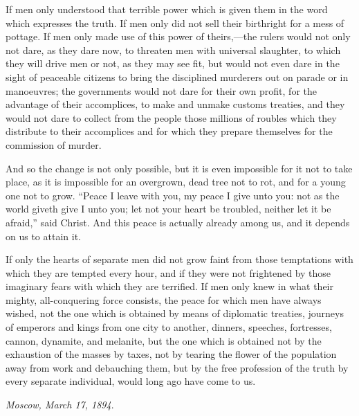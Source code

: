 \documentclass{book}
\begin{document}
If men only understood that terrible power which is given them in the word which expresses the truth. If men only did not sell their birthright for a mess of pottage. If men only made use of this power of theirs,—the rulers would not only not dare, as they dare now, to threaten men with universal slaughter, to which they will drive men or not, as they may see fit, but would not even dare in the sight of peaceable citizens to bring the disciplined murderers out on parade or in manoeuvres; the governments would not dare for their own profit, for the advantage of their accomplices, to make and unmake customs treaties, and they would not dare to collect from the people those millions of roubles which they distribute to their accomplices and for which they prepare themselves for the commission of murder.

And so the change is not only possible, but it is even impossible for it not to take place, as it is impossible for an overgrown, dead tree not to rot, and for a young one not to grow. “Peace I leave with you, my peace I give unto you: not as the world giveth give I unto you; let not your heart be troubled, neither let it be afraid,” said Christ. And this peace is actually already among us, and it depends on us to attain it.

If only the hearts of separate men did not grow faint from those temptations with which they are tempted every hour, and if they were not frightened by those imaginary fears with which they are terrified. If men only knew in what their mighty, all-conquering force consists, the peace for which men have always wished, not the one which is obtained by means of diplomatic treaties, journeys of emperors and kings from one city to another, dinners, speeches, fortresses, cannon, dynamite, and melanite, but the one which is obtained not by the exhaustion of the masses by taxes, not by tearing the flower of the population away from work and debauching them, but by the free profession of the truth by every separate individual, would long ago have come to us.

\emph{Moscow, March 17, 1894}.
\end{document}
